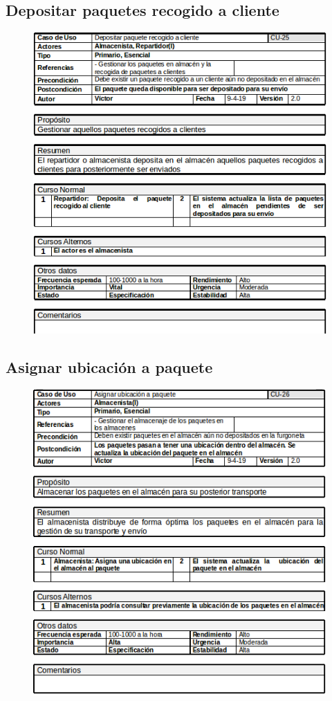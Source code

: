 \subsection{Depositar paquetes recogido a cliente}
\begin{figure}[H]
	\centering
	\includegraphics[width=16cm]{25}
\end{figure}
\subsection{Asignar ubicación a paquete}
\begin{figure}[H]
	\centering
	\includegraphics[width=16cm]{26}
\end{figure}
